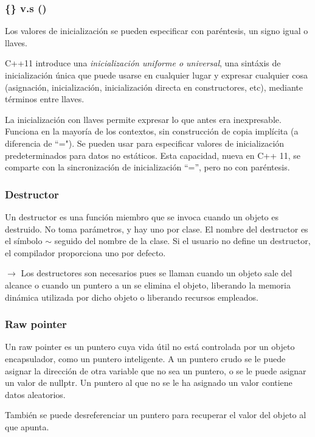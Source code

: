 \documentclass{beamer}
\begin{document}

	\begin{frame}
		\frametitle{\{\} v.s ()}
		Los valores de inicialización se pueden especificar con paréntesis, un signo igual o llaves.
		
		C++11 introduce una \textit{inicialización uniforme o universal}, una sint\'axis de inicialización única que puede usarse en cualquier lugar y expresar cualquier cosa (asignación, inicialización, inicialización directa en constructores, etc), mediante t\'erminos entre llaves.
		
		La inicialización con llaves permite expresar lo que antes era inexpresable. Funciona en la mayoría de los contextos, sin construcción de copia implícita (a diferencia de ``="). Se pueden usar para especificar valores de inicialización predeterminados para datos no estáticos. Esta capacidad, nueva en C++ 11, se comparte con la sincronización de inicialización “=”, pero no con paréntesis.
	\end{frame}


	\begin{frame}
		\frametitle{Destructor}
		Un destructor es una función miembro que se invoca cuando un objeto es destruido. No toma parámetros, y hay uno por clase. El nombre del destructor es el s\'imbolo $ \sim $ seguido del nombre de la clase. Si el usuario no define un destructor, el compilador proporciona uno por defecto.
		
		$\rightarrow$ Los destructores son necesarios pues se llaman cuando un objeto sale del alcance o cuando un puntero a un se elimina el objeto, liberando la memoria dinámica utilizada por dicho objeto o liberando recursos empleados. 
	\end{frame}

	\begin{frame}
		\frametitle{Raw pointer}
		Un raw pointer es un puntero cuya vida útil no está controlada por un objeto encapsulador, como un puntero inteligente. A un puntero crudo se le puede asignar la dirección de otra variable que no sea un puntero, o se le puede asignar un valor de nullptr. Un puntero al que no se le ha asignado un valor contiene datos aleatorios.
		
		También se puede desreferenciar un puntero para recuperar el valor del objeto al que apunta.
	\end{frame}
\end{document}
